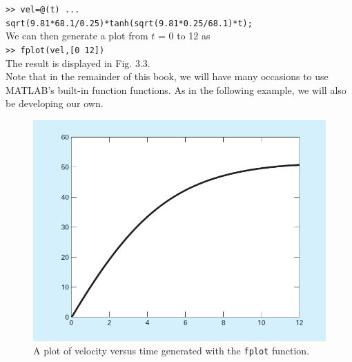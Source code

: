 \documentclass[../main.tex]{subfiles}
\begin{document}
\texttt{>> vel=@(t) ...\\
\indent sqrt(9.81*68.1/0.25)*tanh(sqrt(9.81*0.25/68.1)*t);}\\

\noindent We can then generate a plot from $t$ = 0 to 12 as\\

\texttt{>> fplot(vel,[0 12])}\\

\noindent The result is displayed in Fig. 3.3.\\
\indent Note that in the remainder of this book, we will have many occasions to use MATLAB's
built-in function functions. As in the following example, we will also be developing
our own.\\

\begin{figure}[h]
    \includegraphics[width=0.5\linewidth]{./images/fig_3_3}
    \caption{A plot of velocity versus time generated with the \texttt{fplot} function.}
\end{figure}
\end{document}
